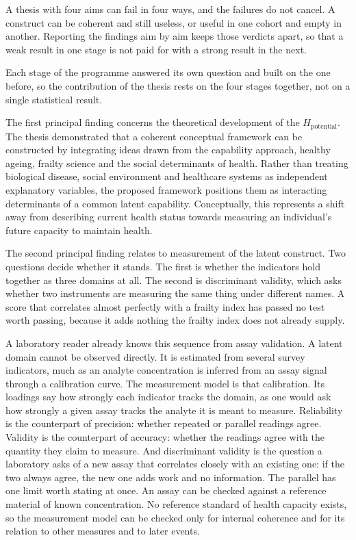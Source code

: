 \noindent A thesis with four aims can fail in four ways, and the failures do not
cancel. A construct can be coherent and still useless, or useful in one cohort
and empty in another. Reporting the findings aim by aim keeps those verdicts
apart, so that a weak result in one stage is not paid for with a strong result
in the next.

\noindent Each stage of the programme answered its own question and built on the one before, so the contribution of the thesis rests on the four stages together, not on a single statistical result.

The first principal finding concerns the theoretical development of the $H_{\text{potential}}$. The thesis demonstrated that a coherent conceptual framework can be constructed by integrating ideas drawn from the capability approach, healthy ageing, frailty science and the social determinants of health. Rather than treating biological disease, social environment and healthcare systems as independent explanatory variables, the proposed framework positions them as interacting determinants of a common latent capability. Conceptually, this represents a shift away from describing current health status towards measuring an individual's future capacity to maintain health.

The second principal finding relates to measurement of the latent construct.
Two questions decide whether it stands. The first is whether the indicators hold
together as three domains at all. The second is discriminant validity, which
asks whether two instruments are measuring the same thing under different names.
A score that correlates almost perfectly with a frailty index has passed no test
worth passing, because it adds nothing the frailty index does not already
supply.

A laboratory reader already knows this sequence from assay validation. A latent
domain cannot be observed directly. It is estimated from several survey
indicators, much as an analyte concentration is inferred from an assay signal
through a calibration curve. The measurement model is that calibration. Its
loadings say how strongly each indicator tracks the domain, as one would ask how
strongly a given assay tracks the analyte it is meant to measure. Reliability is
the counterpart of precision: whether repeated or parallel readings agree.
Validity is the counterpart of accuracy: whether the readings agree with the
quantity they claim to measure. And discriminant validity is the question a
laboratory asks of a new assay that correlates closely with an existing one: if
the two always agree, the new one adds work and no information. The parallel has
one limit worth stating at once. An assay can be checked against a reference
material of known concentration. No reference standard of health capacity exists,
so the measurement model can be checked only for internal coherence and for its
relation to other measures and to later events.

